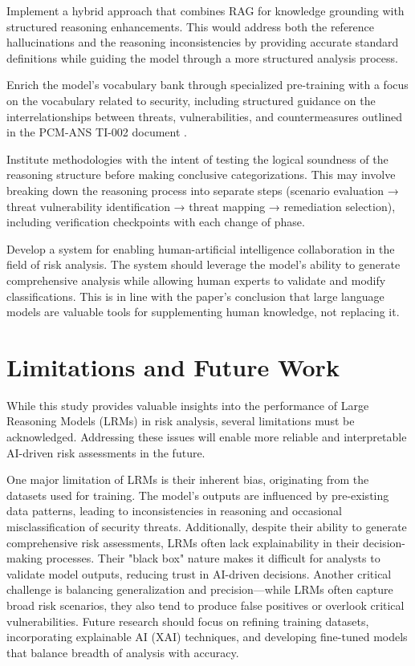 \documentclass[sigconf]{acmart}
\begin{document}
Implement a hybrid approach that combines RAG for knowledge grounding with structured reasoning enhancements. This would address both the reference hallucinations and the reasoning inconsistencies by providing accurate standard definitions while guiding the model through a more structured analysis process.

Enrich the model's vocabulary bank through specialized pre-training with a focus on the vocabulary related to security, including structured guidance on the interrelationships between threats, vulnerabilities, and countermeasures outlined in the PCM-ANS TI-002 document \citep{NationalSecurity1995}.

Institute methodologies with the intent of testing the logical soundness of the reasoning structure before making conclusive categorizations. This may involve breaking down the reasoning process into separate steps (scenario evaluation → threat vulnerability identification → threat mapping → remediation selection), including verification checkpoints with each change of phase.

Develop a system for enabling human-artificial intelligence collaboration in the field of risk analysis. The system should leverage the model's ability to generate comprehensive analysis while allowing human experts to validate and modify classifications. This is in line with the paper's conclusion that large language models are valuable tools for supplementing human knowledge, not replacing it.

\section{Limitations and Future Work}
While this study provides valuable insights into the performance of Large Reasoning Models (LRMs) in risk analysis, several limitations must be acknowledged. Addressing these issues will enable more reliable and interpretable AI-driven risk assessments in the future.

One major limitation of LRMs is their inherent bias, originating from the datasets used for training. The model's outputs are influenced by pre-existing data patterns, leading to inconsistencies in reasoning and occasional misclassification of security threats. Additionally, despite their ability to generate comprehensive risk assessments, LRMs often lack explainability in their decision-making processes. Their "black box" nature makes it difficult for analysts to validate model outputs, reducing trust in AI-driven decisions. Another critical challenge is balancing generalization and precision—while LRMs often capture broad risk scenarios, they also tend to produce false positives or overlook critical vulnerabilities. Future research should focus on refining training datasets, incorporating explainable AI (XAI) techniques, and developing fine-tuned models that balance breadth of analysis with accuracy.
\end{document}
